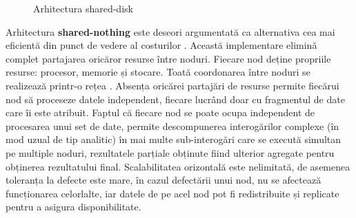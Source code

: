 \begin{figure}[htbp]
    \centering
    \caption{Arhitectura shared-disk}
    \label{fig:shared-disk}
\end{figure}

Arhitectura \textbf{shared-nothing} este deseori argumentată ca alternativa cea mai eficientă din punct de vedere al costurilor \cite{stonebraker1986}. Această implementare elimină complet partajarea oricăror resurse între noduri. Fiecare nod deține propriile resurse: procesor, memorie și stocare. Toată coordonarea între noduri se realizează printr-o rețea \cite{dewitt1992}. Absența oricărei partajări de resurse permite fiecărui nod să proceseze datele independent, fiecare lucrând doar cu fragmentul de date care îi este atribuit. Faptul că fiecare nod se poate ocupa independent de procesarea unui set de date, permite descompunerea interogărilor complexe (în mod uzual de tip analitic) în mai multe sub-interogări care se execută simultan pe multiple noduri, rezultatele parțiale obținute fiind ulterior agregate pentru obținerea rezultatului final. Scalabilitatea orizontală este nelimitată, de asemenea toleranța la defecte este mare, în cazul defectării unui nod, nu se afectează funcționarea celorlalte, iar datele de pe acel nod pot fi redistribuite și replicate pentru a asigura disponibilitate.

